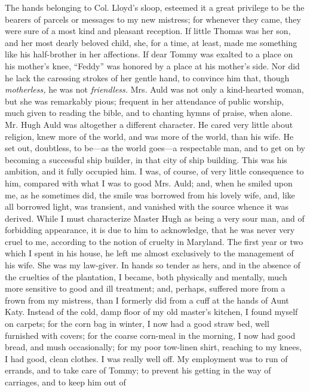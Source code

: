 The hands belonging to Col. Lloyd's sloop, esteemed it a great privilege
to be the bearers of parcels or messages to my new mistress; for
whenever they came, they were sure of a most kind and pleasant
reception. If little Thomas was her son, and her most dearly beloved
child, she, for a time, at least, made me something like his
half-brother in her affections. If dear Tommy was exalted to a place on
his mother's knee, ``Feddy'' was honored by a place at his mother's
side. Nor did he lack the caressing strokes of her gentle hand, to
convince him that, though \emph{motherless,} he was not
\emph{friendless.} Mrs. Auld was not only a kind-hearted woman, but she
was remarkably pious; frequent in her attendance of public worship, much
given to reading the bible, and to chanting hymns of praise, when alone.
Mr. Hugh Auld was altogether a different character. He cared very little
about religion, knew more of the world, and was more of the world, than
his wife. He set out, doubtless, to be---as the world goes---a
respectable man, and to get on by becoming a successful ship builder, in
that city of ship building. This was his ambition, and it fully occupied
him. I was, of course, of very little consequence to him, compared with
what I was to good Mrs. Auld; and, when he smiled upon me, as he
sometimes did, the smile was borrowed from his lovely wife, and, like
all borrowed light, was transient, and vanished with the source whence
it was derived. While I must characterize Master Hugh as being a very
sour man, and of forbidding appearance, it is due to him to acknowledge,
that he was never {\protect\hypertarget{144}{}{}}very cruel to me,
according to the notion of cruelty in Maryland. The first year or two
which I spent in his house, he left me almost exclusively to the
management of his wife. She was my law-giver. In hands so tender as
hers, and in the absence of the cruelties of the plantation, I became,
both physically and mentally, much more sensitive to good and ill
treatment; and, perhaps, suffered more from a frown from my mistress,
than I formerly did from a cuff at the hands of Aunt Katy. Instead of
the cold, damp floor of my old master's kitchen, I found myself on
carpets; for the corn bag in winter, I now had a good straw bed, well
furnished with covers; for the coarse corn-meal in the morning, I now
had good bread, and mush occasionally; for my poor tow-linen shirt,
reaching to my knees, I had good, clean clothes. I was really well off.
My employment was to run of errands, and to take care of Tommy; to
prevent his getting in the way of carriages, and to keep him out of
